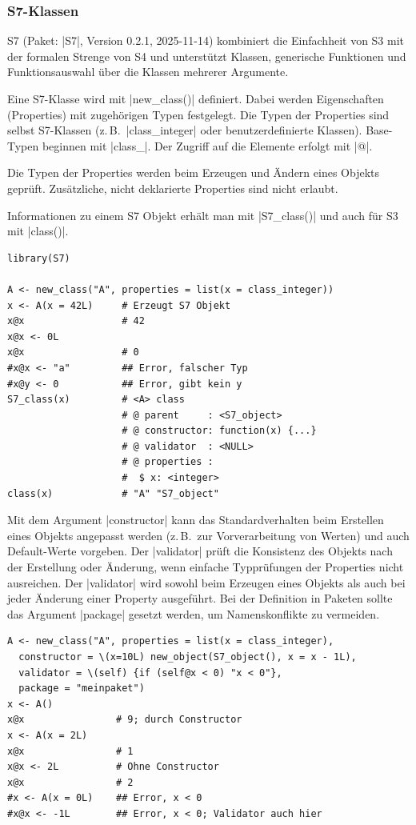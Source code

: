 \documentclass[10pt,twocolumn]{scrartcl}
\renewcommand{\lstinline}{\mycoloredinline}
\begin{document}
\subsubsection{S7-Klassen}

S7 (Paket: \lstinline|S7|, Version 0.2.1, 2025-11-14) kombiniert die Einfachheit von S3 mit der formalen Strenge von S4 und unterstützt Klassen, generische Funktionen und Funktionsauswahl über die Klassen mehrerer Argumente.

Eine S7-Klasse wird mit \lstinline|new_class()| definiert. Dabei werden Eigenschaften (Properties) mit zugehörigen Typen festgelegt. Die Typen der Properties sind selbst S7-Klassen (z.\,B.\ \lstinline|class_integer| oder benutzerdefinierte Klassen). Base-Typen beginnen mit \lstinline|class_|. Der Zugriff auf die Elemente erfolgt mit \lstinline|@|.

Die Typen der Properties werden beim Erzeugen und Ändern eines Objekts geprüft. Zusätzliche, nicht deklarierte Properties sind nicht erlaubt.

Informationen zu einem S7 Objekt erhält man mit \lstinline|S7_class()| und auch für S3 mit \lstinline|class()|.

\begin{lstlisting}
library(S7)

A <- new_class("A", properties = list(x = class_integer))
x <- A(x = 42L)     # Erzeugt S7 Objekt
x@x                 # 42
x@x <- 0L
x@x                 # 0
#x@x <- "a"         ## Error, falscher Typ
#x@y <- 0           ## Error, gibt kein y
S7_class(x)         # <A> class
                    # @ parent     : <S7_object>
                    # @ constructor: function(x) {...}
                    # @ validator  : <NULL>
                    # @ properties :
                    #  $ x: <integer>
class(x)            # "A" "S7_object"
\end{lstlisting}

Mit dem Argument \lstinline|constructor| kann das Standardverhalten beim Erstellen eines Objekts angepasst werden (z.\,B.\ zur Vorverarbeitung von Werten) und auch Default-Werte vorgeben. Der \lstinline|validator| prüft die Konsistenz des Objekts nach der Erstellung oder Änderung, wenn einfache Typprüfungen der Properties nicht ausreichen. Der \lstinline|validator| wird sowohl beim Erzeugen eines Objekts als auch bei jeder Änderung einer Property ausgeführt. Bei der Definition in Paketen sollte das Argument \lstinline|package| gesetzt werden, um Namenskonflikte zu vermeiden.

\begin{lstlisting}
A <- new_class("A", properties = list(x = class_integer),
  constructor = \(x=10L) new_object(S7_object(), x = x - 1L),
  validator = \(self) {if (self@x < 0) "x < 0"},
  package = "meinpaket")
x <- A()
x@x                # 9; durch Constructor
x <- A(x = 2L)
x@x                # 1
x@x <- 2L          # Ohne Constructor
x@x                # 2
#x <- A(x = 0L)    ## Error, x < 0
#x@x <- -1L        ## Error, x < 0; Validator auch hier
\end{lstlisting}
\end{document}
